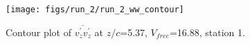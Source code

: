 \begin{figure}[H]
\centering
\texttt{[image: figs/run\_2/run\_2\_ww\_contour]}
\caption{Contour plot of $\overline{v_{z}^{\prime} v_{z}^{\prime}}$ at $z/c$=5.37, $V_{free}$=16.88, station 1.}
\label{fig:run_2_ww_contour}
\end{figure}


